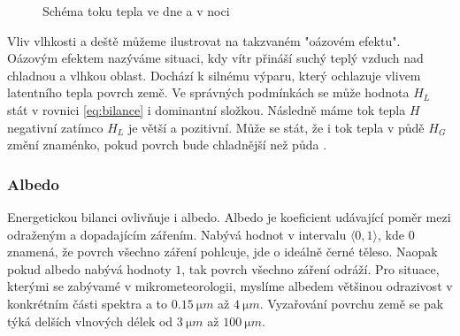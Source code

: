 \begin{figure}
\centering
\caption{Schéma toku tepla ve dne a v noci}
\label{fig:schema}
\end{figure}

Vliv vlhkosti a deště můžeme ilustrovat na takzvaném "oázovém efektu". Oázovým efektem nazýváme situaci, kdy vítr přináší suchý teplý vzduch nad chladnou a vlhkou oblast. Dochází k silnému výparu, který ochlazuje vlivem latentního tepla povrch země. Ve správných podmínkách se může hodnota $H_L$ stát v rovnici \eqref{eq:bilance} i dominantní složkou. Následně máme tok tepla $H$ negativní zatímco $H_L$ je větší a pozitivní. Může se stát, že i tok tepla v půdě $H_G$ změní znaménko, pokud povrch bude chladnější než půda \parencite{arya2001}.

\subsubsection{Albedo}
Energetickou bilanci ovlivňuje i albedo. Albedo je koeficient udávající poměr mezi odraženým a dopadajícím zářením. Nabývá hodnot v intervalu $\langle 0,1\rangle$, kde $0$ znamená, že povrch všechno záření pohlcuje, jde o ideálně černé těleso. Naopak pokud albedo nabývá hodnoty $1$, tak povrch všechno záření odráží. Pro situace, kterými se zabývamé v mikrometeorologii, myslíme albedem většinou odrazivost v konkrétním části spektra a to $\SI{0.15}{\micro m}$ až $\SI{4}{\micro m}$. Vyzařování povrchu země se pak týká delších vlnových délek od $\SI{3}{\micro m}$ až $\SI{100}{\micro m}$. 

